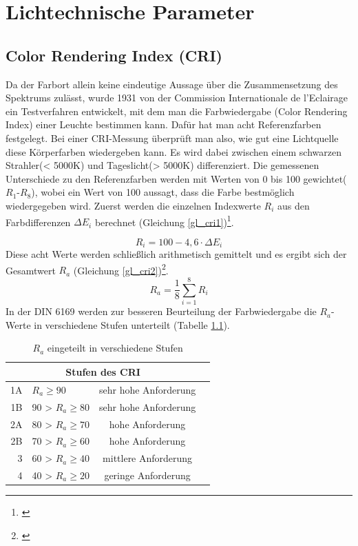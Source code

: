 \chapter{Lichtechnische Parameter}

\section{Color Rendering Index (CRI)} \label{sec_cri}

Da der Farbort allein keine eindeutige Aussage über die Zusammensetzung des Spektrums zulässt, wurde 1931 von der Commission Internationale de l'Eclairage ein Testverfahren entwickelt, mit dem man die Farbwiedergabe (Color Rendering Index) einer Leuchte bestimmen kann. Dafür hat man acht Referenzfarben festgelegt. Bei einer CRI-Messung überprüft man also, wie gut eine Lichtquelle diese Körperfarben wiedergeben kann. Es wird dabei zwischen einem schwarzen Strahler(< 5000K) und Tageslicht(> 5000K) differenziert. Die gemessenen Unterschiede zu den Referenzfarben werden mit Werten von 0 bis 100 gewichtet($R_{1}$-$R_{8}$), wobei ein Wert von 100 aussagt, dass die Farbe bestmöglich wiedergegeben wird. Zuerst werden die einzelnen Indexwerte $R_{i}$ aus den Farbdifferenzen $\Delta E_{i}$ berechnet (Gleichung \ref{gl_cri1})\footnote{\cite{davis_ohno}}.

	\begin{equation}\label{gl_cri1}
		R_{i} = 100 - 4,6 \cdot \Delta E_{i}
	\end{equation}
Diese acht Werte werden schließlich arithmetisch gemittelt und es ergibt sich der Gesamtwert $R_{a}$ (Gleichung \ref{gl_cri2})\footnote{\cite{production partner}}.
	\begin{equation}\label{gl_cri2}
		R_{a} =\frac{1}{8} \sum_{i=1}^{8} R_{i}
	\end{equation}
In der DIN 6169 werden zur besseren Beurteilung der Farbwiedergabe die $R_{a}$-Werte in verschiedene Stufen unterteilt (Tabelle \ref{t_cri}).

	\begin{table}[htp] 
		\centering
		\begin{tabular}{rlcc}  %
		\toprule
		\multicolumn{3}{c}{\large\sffamily Stufen des CRI}\\ 							
		\midrule
		1A & $R_{a} \geq 90$ & sehr hohe Anforderung\\ 
		1B & 90 > $R_{a} \geq 80$ & sehr hohe Anforderung\\
		2A & 80 > $R_{a} \geq 70$ & hohe Anforderung\\
		2B & 70 > $R_{a} \geq 60$ & hohe Anforderung\\
		3 & 60 > $R_{a} \geq 40$ & mittlere Anforderung\\
		4 & 40 > $R_{a} \geq 20$ & geringe Anforderung\\
		\bottomrule
		\end{tabular}
		\caption{$R_{a}$ eingeteilt in verschiedene Stufen\protect\footnotemark}	
		\label{t_cri}
	\end{table}

